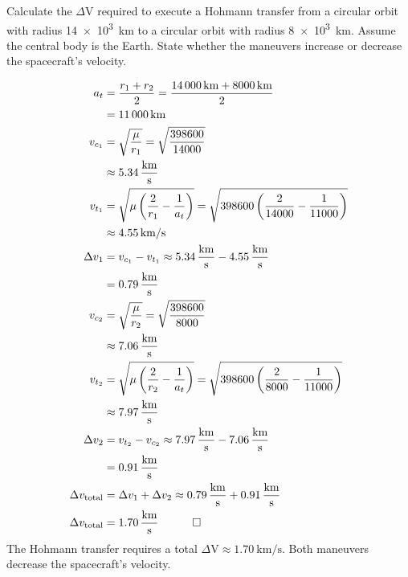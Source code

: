 \begin{hwkProblem}{3}{}

	Calculate the \( \Delta \mathrm{V} \) required to execute a Hohmann transfer from a circular orbit with radius \qty{14e3}{\km} to a circular orbit with radius \qty{8e3}{\km}. Assume the central body is the Earth. State whether the maneuvers increase or decrease the spacecraft's velocity.

	\hwkSol

	\begin{align*}
		a_t &= \frac{r_1 + r_2}{2} = \frac{\SI{14000}{\km} + \SI{8000}{\km}}{2} \\
		      &= \qty{11000}{\km} \\
		v_{c_{1}} &= \sqrt{\frac{\mu}{r_1}} = \sqrt{\frac{398600}{14000}} \\
                                       &\approx \qty{5.34}{\km\per\s} \\
		v_{t_{1}} &= \sqrt{\mu\left(\frac{2}{r_1} - \frac{1}{a_t}\right)} = \sqrt{398600\left(\frac{2}{14000} - \frac{1}{11000}\right)} \\
			 &\approx \SI{4.55}{\km/s} \\
              	\Delta v_1 &= v_{c_{1}} - v_{t_{1}} \approx \qty{5.34}{\km\per\s} - \qty{4.55}{\km\per\s} \\
                                       &= \qty{0.79}{\km\per\s} \\
		v_{c_{2}} &= \sqrt{\frac{\mu}{r_2}} = \sqrt{\frac{398600}{8000}} \\
                                 &\approx \qty{7.06}{\km\per\s} \\
		v_{t_{2}} &= \sqrt{\mu\left(\frac{2}{r_2} - \frac{1}{a_t}\right)} = \sqrt{398600\left(\frac{2}{8000} - \frac{1}{11000}\right)} \\
			 &\approx \qty{7.97}{\km\per\s} \\
		\Delta v_2 &= v_{t_{2}} - v_{c_{2}} \approx \qty{7.97}{\km\per\s} - \qty{7.06}{\km\per\s} \\
                                       &= \qty{0.91}{\km\per\s} \\
		\Delta v_{\text{total}} &= \Delta v_1 + \Delta v_2 \approx \qty{0.79}{\km\per\s} + \qty{0.91}{\km\per\s} \\ 
		\Delta v_{\text{total}} &= \qty{1.70}{\km\per\s} \quad \qed
	\end{align*}
	The Hohmann transfer requires a total \( \Delta \mathrm{V} \approx \qty{1.70}{\km\per\s} \). Both maneuvers decrease the spacecraft's velocity.

\end{hwkProblem}

